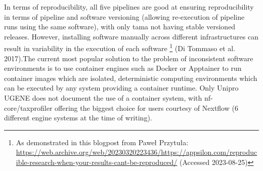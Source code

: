 \documentclass[
]{article}
\begin{document}
In terms of reproducibility, all five pipelines are good at ensuring
reproducibility in terms of pipeline and software versioning (allowing
re-execution of pipeline runs using the same software), with only tama
not having stable versioned releases. However, installing software
manually across different infrastructures can result in variability in
the execution of each software \footnote{As demonstrated in this
  blogpost from Paweł Przytuła:
  \url{https://web.archive.org/web/20230320223436/https://appsilon.com/reproducible-research-when-your-results-cant-be-reproduced/}
  (Accessed 2023-08-25)} (Di Tommaso et al. 2017).The current most
popular solution to the problem of inconsistent software environments is
to use container engines such as Docker or Apptainer to run container
images which are isolated, deterministic computing environments which
can be executed by any system providing a container runtime. Only Unipro
UGENE does not document the use of a container system, with
nf-core/taxprofiler offering the biggest choice for users courtesy of
Nextflow (6 different engine systems at the time of writing).
\end{document}
